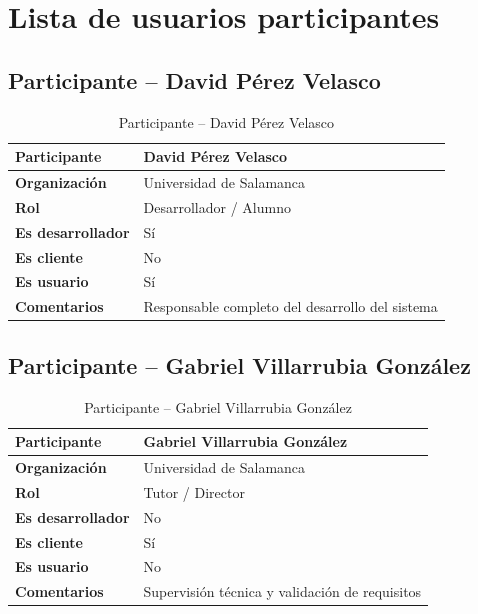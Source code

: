 \documentclass[11pt, a4paper]{article}
\begin{document}
\section{Lista de usuarios participantes}

\subsection{Participante -- David Pérez Velasco}

\begin{table}[H]
    \centering
    \small
    \begin{tabular}{|p{4cm}|p{10cm}|}
    \hline
    \textbf{Participante} & David Pérez Velasco \\
    \hline
    \textbf{Organización} & Universidad de Salamanca \\
    \hline
    \textbf{Rol} & Desarrollador / Alumno \\
    \hline
    \textbf{Es desarrollador} & Sí \\
    \hline
    \textbf{Es cliente} & No \\
    \hline
    \textbf{Es usuario} & Sí \\
    \hline
    \textbf{Comentarios} & Responsable completo del desarrollo del sistema \\
    \hline
    \end{tabular}
    \caption{Participante -- David Pérez Velasco}
\end{table}

\subsection{Participante -- Gabriel Villarrubia González}

\begin{table}[H]
    \centering
    \small
    \begin{tabular}{|p{4cm}|p{10cm}|}
    \hline
    \textbf{Participante} & Gabriel Villarrubia González \\
    \hline
    \textbf{Organización} & Universidad de Salamanca \\
    \hline
    \textbf{Rol} & Tutor / Director \\
    \hline
    \textbf{Es desarrollador} & No \\
    \hline
    \textbf{Es cliente} & Sí \\
    \hline
    \textbf{Es usuario} & No \\
    \hline
    \textbf{Comentarios} & Supervisión técnica y validación de requisitos \\
    \hline
    \end{tabular}
    \caption{Participante -- Gabriel Villarrubia González}
\end{table}
\end{document}
